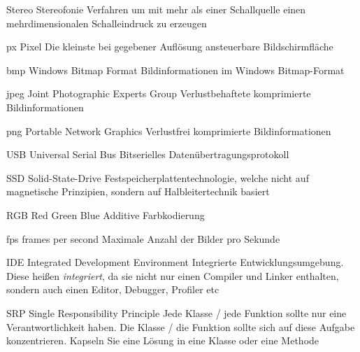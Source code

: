 
  {Stereo}            %
  {Stereofonie}  %
  {Verfahren um mit mehr als einer Schallquelle einen mehrdimensionalen Schalleindruck zu erzeugen} %

  {px}            %
  {Pixel}  %
  {Die kleinste bei gegebener Auflösung ansteuerbare Bildschirmfläche} %

  {bmp}            %
  {Windows Bitmap Format}  %
  {Bildinformationen im Windows Bitmap-Format} %

  {jpeg}            %
  {Joint Photographic Experts Group}  %
  {Verlustbehaftete komprimierte Bildinformationen} %

  {png}            %
  {Portable Network Graphics}  %
  {Verlustfrei komprimierte Bildinformationen} %

  {USB}            %
  {Universal Serial Bus}  %
  {Bitserielles Datenübertragungsprotokoll} %

  {SSD}            %
  {Solid-State-Drive}  %
  {Festspeicherplattentechnologie, welche nicht auf magnetische Prinzipien, sondern auf Halbleitertechnik basiert} %

  {RGB}            %
  {Red Green Blue}  %
  {Additive Farbkodierung} %

  {fps}            %
  {frames per second}  %
  {Maximale Anzahl der Bilder pro Sekunde} %

  {IDE}            %
  {Integrated Development Environment}  %
  {Integrierte Entwicklungsumgebung. Diese heißen \emph{integriert}, da sie nicht nur einen Compiler und Linker enthalten, sondern auch einen Editor, Debugger, Profiler etc} %

  {SRP}            %
  {Single Responsibility Principle}  %
  {Jede Klasse / jede Funktion sollte nur eine Verantwortlichkeit haben. Die Klasse / die Funktion sollte sich
  auf diese Aufgabe konzentrieren. Kapseln Sie eine Lösung in eine Klasse oder eine Methode} %

